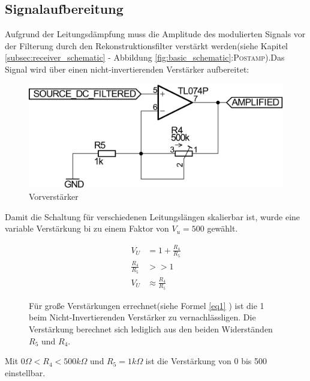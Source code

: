 \newpage
\subsection{Signalaufbereitung}
\label{subsec:pre_amplifier}
Aufgrund der Leitungsdämpfung muss die Amplitude des modulierten Signals vor der Filterung durch den Rekonstruktionsfilter verstärkt werden(siehe Kapitel \ref{subsec:receiver_schematic} - Abbildung \ref{fig:basic_schematic}:\textsc{Postamp}).Das Signal wird über einen nicht-invertierenden Verstärker aufbereitet:
\begin{figure}[H]
\centering
 \includegraphics[scale=0.40]{gfx/preamp}
	\caption{Vorverstärker}
\end{figure}
Damit die Schaltung für verschiedenen Leitungslängen skalierbar ist, wurde eine variable Verstärkung bi zu einem Faktor von $V_u = 500$ gewählt. 
\begin{figure}[H]
\begin{minipage}{0.45\textwidth} 
	\begin{align}
	V_U&=1+\frac{R_4}{R_5}\\
	\frac{R_4}{R_5} &>> 1\\
	V_U&\approx\frac{R_4}{R_5} \label{eq1}
	\end{align}
	\end{minipage}
	\hfill
\begin{minipage}{0.45\textwidth}
Für große Verstärkungen errechnet(siehe Formel \ref{eq1} \footnotemark) ist die 1 beim Nicht-Invertierenden Verstärker zu vernachlässligen. Die Verstärkung berechnet sich lediglich aus den beiden Widerständen $R_{5}$ und $R_{4}$. 
\end{minipage}
\end{figure}
\noindent
Mit $0\Omega < R_4 < 500k\Omega$ und $R_5=1k\Omega$ ist die Verstärkung von 0 bis 500 einstellbar.
\\

